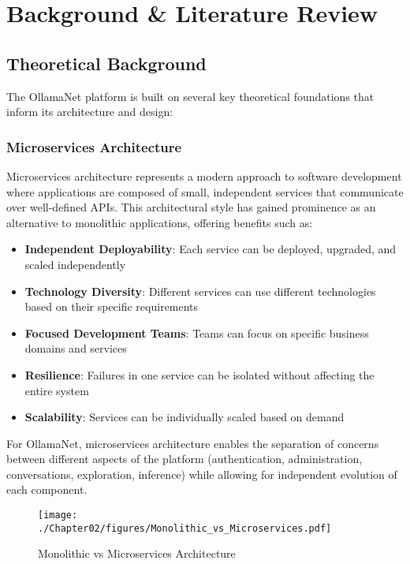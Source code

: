 \def\chapdir{./Chapter02}

\chapter{Background \& Literature Review} \label{ch:background}

\section{Theoretical Background}

The OllamaNet platform is built on several key theoretical foundations that inform its architecture and design:

\subsection{Microservices Architecture}

Microservices architecture represents a modern approach to software development where applications are composed of small, independent services that communicate over well-defined APIs. This architectural style has gained prominence as an alternative to monolithic applications, offering benefits such as:

\begin{itemize}
    \item \textbf{Independent Deployability}: Each service can be deployed, upgraded, and scaled independently
    \item \textbf{Technology Diversity}: Different services can use different technologies based on their specific requirements
    \item \textbf{Focused Development Teams}: Teams can focus on specific business domains and services
    \item \textbf{Resilience}: Failures in one service can be isolated without affecting the entire system
    \item \textbf{Scalability}: Services can be individually scaled based on demand
\end{itemize}

For OllamaNet, microservices architecture enables the separation of concerns between different aspects of the platform (authentication, administration, conversations, exploration, inference) while allowing for independent evolution of each component.

\begin{sidewaysfigure}[p]
    \centering
    \texttt{[image: ./Chapter02/figures/Monolithic\_vs\_Microservices.pdf]}
    \caption{Monolithic vs Microservices Architecture}
    \label{fig:mono-vs-micro}
\end{sidewaysfigure}
\clearpage

